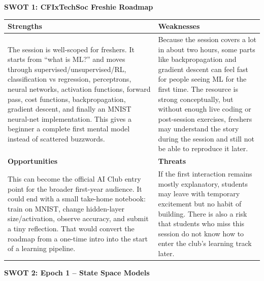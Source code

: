 \documentclass[11pt,a4paper]{article}
\begin{document}
\textbf{SWOT 1: CFIxTechSoc Freshie Roadmap}

\begin{center}
\renewcommand{\arraystretch}{1.35}
\begin{tabular}{p{}|p{}}
\textbf{Strengths} & \textbf{Weaknesses} \\
\hline
The session is well-scoped for freshers. It starts from ``what is ML?'' and moves through supervised/unsupervised/RL, classification vs regression, perceptrons, neural networks, activation functions, forward pass, cost functions, backpropagation, gradient descent, and finally an MNIST neural-net implementation. This gives a beginner a complete first mental model instead of scattered buzzwords. & Because the session covers a lot in about two hours, some parts like backpropagation and gradient descent can feel fast for people seeing ML for the first time. The resource is strong conceptually, but without enough live coding or post-session exercises, freshers may understand the story during the session and still not be able to reproduce it later. \\
\hline
\textbf{Opportunities} & \textbf{Threats} \\
\hline
This can become the official AI Club entry point for the broader first-year audience. It could end with a small take-home notebook: train on MNIST, change hidden-layer size/activation, observe accuracy, and submit a tiny reflection. That would convert the roadmap from a one-time intro into the start of a learning pipeline. & If the first interaction remains mostly explanatory, students may leave with temporary excitement but no habit of building. There is also a risk that students who miss this session do not know how to enter the club's learning track later. \\
\end{tabular}
\end{center}

\textbf{SWOT 2: Epoch 1 -- State Space Models}
\end{document}
